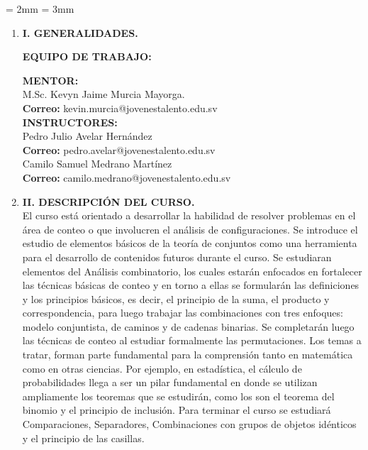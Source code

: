 %

\parskip = 2mm   %
\parindent = 3mm



\thispagestyle{empty}

\newpage

\begin{enumerate}
\thispagestyle{empty}

\item  {\bf \large  I. GENERALIDADES.}

\vspace{1cm}
{\bf EQUIPO DE TRABAJO:}


\textbf{MENTOR:}\\
 M.Sc. Kevyn Jaime Murcia Mayorga.\\
\textbf{Correo:} kevin.murcia@jovenestalento.edu.sv\\

\textbf{INSTRUCTORES:}\\
Pedro Julio Avelar Hernández\\
\textbf{Correo:} pedro.avelar@jovenestalento.edu.sv\\

Camilo Samuel Medrano Martínez\\
\textbf{Correo:} camilo.medrano@jovenestalento.edu.sv\\


\item {\bf \large II. DESCRIPCI\'ON DEL CURSO.}\\

El curso está orientado a desarrollar la habilidad de resolver problemas en el área de conteo o
que involucren el análisis de configuraciones. Se introduce el estudio de elementos básicos de
la teoría de conjuntos como una herramienta para el desarrollo de contenidos futuros durante
el curso. Se estudiaran elementos del  Análisis combinatorio, los cuales estarán enfocados
en fortalecer las técnicas básicas de conteo y en torno a ellas se formularán las definiciones
y los principios básicos, es decir, el principio de la suma, el producto y correspondencia, para
luego trabajar las combinaciones con tres enfoques: modelo conjuntista, de caminos y de cadenas
binarias. Se completarán luego las técnicas de conteo al estudiar formalmente las permutaciones. Los temas
a tratar, forman parte fundamental para la comprensión tanto en
matemática como en otras ciencias. Por ejemplo, en estadística, el cálculo de probabilidades llega
a ser un pilar fundamental en donde se utilizan ampliamente los teoremas que se estudirán, como
los son el teorema del binomio y el principio de inclusión. Para terminar el curso se estudiará
Comparaciones, Separadores, Combinaciones con grupos de objetos idénticos y el principio de las casillas.





\end{enumerate}
